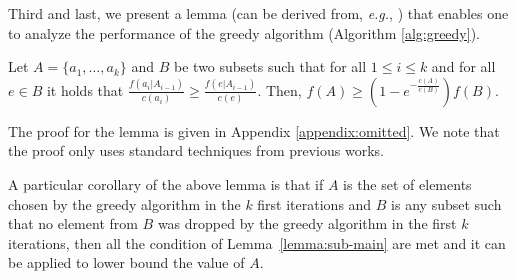 Third and last, we present a lemma (can be derived from, {\em e.g.}, \cite{khuller1999budgeted}) that enables one to analyze the performance of the greedy algorithm (Algorithm \ref{alg:greedy}).
\begin{lemma}
\label{lemma:sub-main}
Let $A = \{a_1, \dots, a_k\}$ and $B$ be two subsets such that for all $1 \leq i \leq k$
and for all $e \in B$ it holds that
$\frac{f(a_i|A_{i-1})}{c(a_i)} \geq \frac{f(e|A_{i-1})}{c(e)}$.
Then, $f(A) \geq (1 - e^{-\frac{c(A)}{c(B)}})f(B)$.
\end{lemma}

The proof for the lemma is given in Appendix  \ref{appendix:omitted}. We note that 
the proof only uses standard techniques from previous works.

A particular corollary of the above lemma is that if $A$ is the set of elements chosen by the greedy algorithm in
the $k$ first iterations and $B$ is any subset such that no element from $B$ was dropped by the greedy algorithm in the first $k$ iterations,
then all the condition of Lemma~\ref{lemma:sub-main} are met and it can be applied to lower bound the value of $A$.


%

%
%

